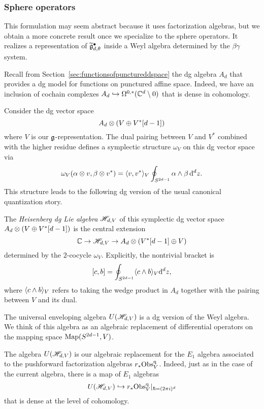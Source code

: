 \subsubsection{Sphere operators}

This formulation may seem abstract because it uses factorization algebras,
but we obtain a more concrete result once we specialize to the sphere operators. 
It realizes a representation of $\widetilde{\mathfrak g}^\bullet_{d,\theta}$ inside a Weyl algebra determined by  the $\beta\gamma$ system.

Recall from Section~\ref{sec:functionsofpunctureddspace} the dg algebra $A_d$ that provides a dg model for functions on punctured affine space.
Indeed, we have an inclusion of cochain complexes $A_d \hookrightarrow \Omega^{0,*}(\mathbb C^d \setminus 0)$ that is dense in cohomology.

Consider the dg vector space
\[
A_d \otimes (V \oplus V^*[d-1])
\]
where $V$ is our $\mathfrak g$-representation. 
The dual pairing between $V$ and $V^*$ combined with the higher residue defines a symplectic structure $\omega_V$ on this dg vector space via
\[
\omega_V(\alpha \otimes v, \beta \otimes v^*) = \langle v, v^*\rangle_V \oint_{S^{2d-1}} \alpha \wedge \beta\, {\rm d}^d z .
\]
This structure leads to the following dg version of the usual canonical quantization story.

\begin{dfn}
The {\em Heisenberg dg Lie algebra} $\mathscr H_{d,V}$ of this symplectic dg vector space $A_d \otimes (V \oplus V^*[d-1])$ is the central extension
\[
\mathbb C \to \mathscr H_{d,V} \to A_d \otimes (V^*[d-1] \oplus V) 
\]
determined by the $2$-cocycle $\omega_V$. 
Explicitly, the nontrivial bracket is
\[
[c, b] =  \oint_{S^{2d-1}} \langle c \wedge b\rangle_V {\rm d}^d z,
\]
where $\langle c \wedge b\rangle_V$ refers to taking the wedge product in $A_d$ together with the pairing between $V$ and its dual. 
\end{dfn}

The universal enveloping algebra $U(\mathscr H_{d,V})$ is a dg version of the Weyl algebra.
We think of this algebra as an algebraic replacement of differential operators on the mapping space ${\rm Map}(S^{2d-1},V)$.

The algebra $U(\mathscr H_{d,V})$ is our algebraic replacement for the $E_1$ algebra associated to the pushforward factorization algebras $r_* {\rm Obs}^{\rm q}_{V}$. 
Indeed, just as in the case of the current algebra, there is a map of $E_1$ algebras
\[
U(\mathscr H_{d,V}) \hookrightarrow r_* {\rm Obs}^{\rm q}_{V}|_{\hbar = (2 \pi i)^d}
\]
that is dense at the level of cohomology. 

